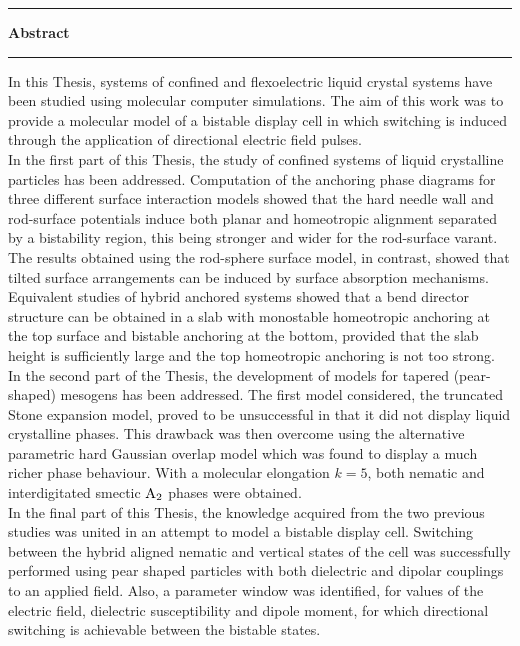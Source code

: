 


\hrule
\begin{center}
	\textbf{\large Abstract}
\end{center}
\hrule
\vspace*{10mm}

In this Thesis, systems of confined and flexoelectric liquid crystal systems have been studied
using molecular computer simulations. The aim of this work was to provide a molecular model 
of a bistable display cell in which switching is induced through the application of directional
electric field pulses.\\

In the first part of this Thesis, the study of confined systems of liquid crystalline particles has
been addressed. Computation of the anchoring phase diagrams for three different surface interaction
models showed that the hard needle wall and rod-surface potentials induce both planar and
homeotropic alignment separated by a bistability region, this being stronger and wider
for the rod-surface varant. The results obtained using the rod-sphere surface model, in
contrast, showed that tilted surface arrangements can be induced by surface absorption mechanisms.
%
Equivalent studies of hybrid anchored systems showed that a bend director structure
can be obtained in a slab with monostable homeotropic anchoring at the top surface and bistable
anchoring at the bottom, provided that the slab height is sufficiently large and the top homeotropic
anchoring is not too strong.\\

In the second part of the Thesis, the development of models for tapered (pear-shaped) mesogens
has been addressed. The first model considered, the truncated Stone expansion model, proved to be
unsuccessful in that it did not display liquid crystalline phases.
This drawback was then overcome using the alternative parametric hard Gaussian overlap model 
which was found to display
a much richer phase behaviour. With a molecular elongation $k=5$, both nematic and
interdigitated smectic ${\rm A_2}$ phases were obtained.\\

In the final part of this Thesis, the knowledge acquired from the two previous studies was
united in an attempt to model a bistable display cell. 
Switching between the hybrid aligned nematic and vertical states of the cell was
successfully performed using pear shaped particles with both dielectric and dipolar 
couplings to an applied field. Also, a parameter window was identified, for 
values of the electric field, dielectric susceptibility and dipole moment, for which directional
switching is achievable between the bistable states.




